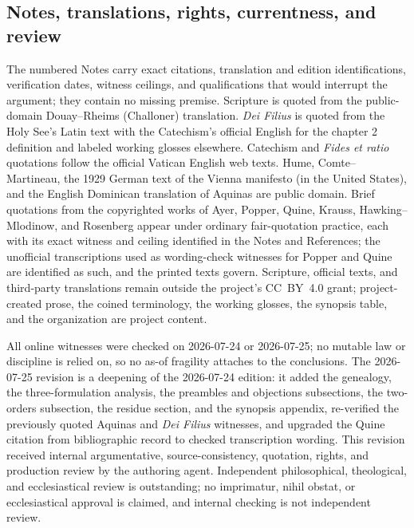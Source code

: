 \subsection{Notes, translations, rights, currentness, and review}

The numbered Notes carry exact citations, translation and edition identifications, verification dates, witness ceilings, and qualifications that would interrupt the argument; they contain no missing premise. Scripture is quoted from the public-domain Douay--Rheims (Challoner) translation. \emph{Dei Filius} is quoted from the Holy See's Latin text with the Catechism's official English for the chapter 2 definition and labeled working glosses elsewhere. Catechism and \emph{Fides et ratio} quotations follow the official Vatican English web texts. Hume, Comte--Martineau, the 1929 German text of the Vienna manifesto (in the United States), and the English Dominican translation of Aquinas are public domain. Brief quotations from the copyrighted works of Ayer, Popper, Quine, Krauss, Hawking--Mlodinow, and Rosenberg appear under ordinary fair-quotation practice, each with its exact witness and ceiling identified in the Notes and References; the unofficial transcriptions used as wording-check witnesses for Popper and Quine are identified as such, and the printed texts govern. Scripture, official texts, and third-party translations remain outside the project's CC~BY~4.0 grant; project-created prose, the coined terminology, the working glosses, the synopsis table, and the organization are project content.

All online witnesses were checked on 2026-07-24 or 2026-07-25; no mutable law or discipline is relied on, so no as-of fragility attaches to the conclusions. The 2026-07-25 revision is a deepening of the 2026-07-24 edition: it added the genealogy, the three-formulation analysis, the preambles and objections subsections, the two-orders subsection, the residue section, and the synopsis appendix, re-verified the previously quoted Aquinas and \emph{Dei Filius} witnesses, and upgraded the Quine citation from bibliographic record to checked transcription wording. This revision received internal argumentative, source-consistency, quotation, rights, and production review by the authoring agent. Independent philosophical, theological, and ecclesiastical review is outstanding; no imprimatur, nihil obstat, or ecclesiastical approval is claimed, and internal checking is not independent review.

